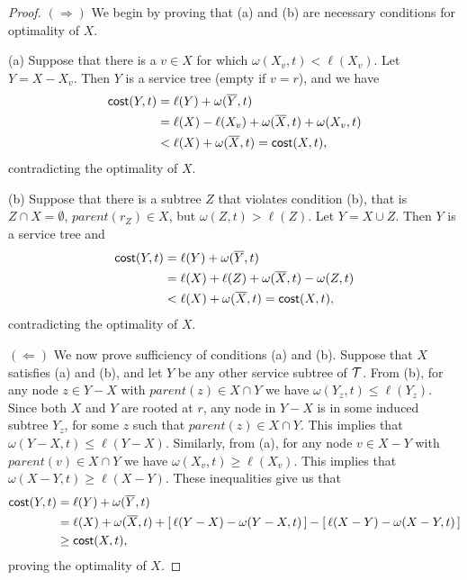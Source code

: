 \documentclass[a4paper]{article}
\newcommand{\barX}{\overline{X}}
\newcommand{\barY}{\overline{Y}}
\newcommand{\calT}{{\cal T}}
\newcommand{\cost}{\mbox{\rm\textsf{cost}}}
\newcommand{\length}{\ell}
\newcommand{\parent}{\textit{parent}}
\begin{document}
\begin{proof}
$(\Rightarrow)$
We begin by proving that (a) and (b) are necessary conditions for optimality
of $X$.

(a) Suppose that there is a $v\in X$ for which $\omega(X_v,t) < \length(X_v)$.
Let $Y = X-X_v$. Then $Y$ is a service tree (empty if $v=r$), and we have
\begin{align*}
	\cost(Y,t) &= \length(Y) + \omega(\barY,t)
			\\
			&= \length(X) - \length(X_v) + \omega(\barX,t) + \omega(X_v,t)
			\\
			&< \length(X) + \omega(\barX,t) = \cost(X,t),
\end{align*}
contradicting the optimality of $X$.

(b) Suppose that there is a subtree $Z$ that violates condition (b), that is $Z\cap X = \emptyset$,
$\parent(r_Z) \in X$, but $\omega(Z,t) > \length(Z)$.
Let $Y= X\cup Z$. Then $Y$ is a service tree and
\begin{align*}
\cost(Y,t) &= \length(Y) + \omega(\barY,t)
 		\\
		&= \length(X) + \length(Z) + \omega(\barX,t) - \omega(Z,t)
		\\
		&< \length(X) + \omega(\barX,t) = \cost(X,t),
\end{align*}
contradicting the optimality of $X$.

$(\Leftarrow)$
We now prove sufficiency of conditions (a) and (b). Suppose that $X$ satisfies
(a) and (b), and let $Y$ be any other service subtree of $\calT$.
From (b), for any node $z\in Y-X$ with $\parent(z) \in X\cap Y$
we have $\omega(Y_z,t)\le \length(Y_z)$. 
Since both $X$ and $Y$ are rooted at $r$, any node in $Y-X$
is in some induced subtree $Y_z$, for some $z$ such that $\parent(z) \in X\cap Y$.
This implies that $\omega(Y-X,t)\le \length(Y-X)$.
Similarly, from (a), for any node $v\in X-Y$ with $\parent(v) \in X\cap Y$
we have $\omega(X_v,t)\ge \length(X_v)$. This implies that
$\omega(X-Y,t) \geq \length(X-Y)$. These inequalities  give us that
\begin{align*}
\cost(Y,t) &= \length(Y) + \omega(\barY,t)
			\\
		&= \length(X) + \omega(\barX,t)
				+ [\,\length(Y-X) - \omega(Y-X,t)\,]
				- [\,\length(X-Y) - \omega(X-Y,t)\,]
			\\
		&\ge \cost(X,t),
\end{align*}
proving the optimality of $X$.
\end{proof}
\end{document}
